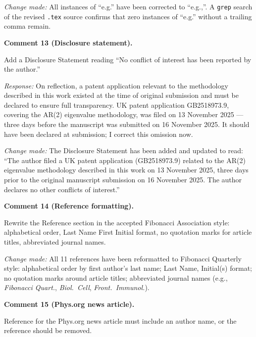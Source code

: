 \documentclass[12pt,a4paper]{article}
\newcommand{\point}[1]{\medskip\noindent\textbf{Comment #1.}\enspace}
\newcommand{\response}{\noindent\textit{Response:}\enspace}
\newcommand{\change}{\noindent\textit{Change made:}\enspace}
\begin{document}
\change
All instances of ``e.g.'' have been corrected to ``e.g.,''.
A \texttt{grep} search of the revised \texttt{.tex} source confirms that
zero instances of ``e.g.'' without a trailing comma remain.

\point{13 (Disclosure statement)}

\begin{reviewbox}
Add a Disclosure Statement reading ``No conflict of interest has been
reported by the author.''
\end{reviewbox}

\response
On reflection, a patent application relevant to the methodology
described in this work existed at the time of original submission and
must be declared to ensure full transparency.
UK patent application GB2518973.9, covering the AR(2) eigenvalue
methodology, was filed on 13 November 2025 --- three days before the
manuscript was submitted on 16 November 2025.
It should have been declared at submission; I correct this omission now.

\change
The Disclosure Statement has been added and updated to read:
``The author filed a UK patent application (GB2518973.9) related to the
AR(2) eigenvalue methodology described in this work on 13 November 2025,
three days prior to the original manuscript submission on 16 November 2025.
The author declares no other conflicts of interest.''

\point{14 (Reference formatting)}

\begin{reviewbox}
Rewrite the Reference section in the accepted Fibonacci Association
style: alphabetical order, Last Name First Initial format, no quotation
marks for article titles, abbreviated journal names.
\end{reviewbox}

\change
All 11 references have been reformatted to Fibonacci Quarterly style:
alphabetical order by first author's last name; Last Name, Initial(s)
format; no quotation marks around article titles; abbreviated journal
names (e.g., \textit{Fibonacci Quart.}, \textit{Biol.\ Cell},
\textit{Front.\ Immunol.}).

\point{15 (Phys.org news article)}

\begin{reviewbox}
Reference for the Phys.org news article must include an author name,
or the reference should be removed.
\end{reviewbox}
\end{document}
